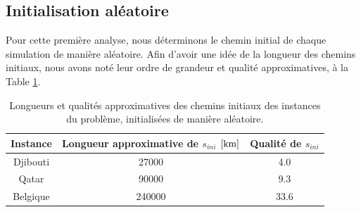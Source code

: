 \documentclass[a4paper, 12pt]{report}
\begin{document}
    \subsection{Initialisation aléatoire}
    Pour cette première analyse, nous déterminons le chemin initial de chaque simulation de manière aléatoire. Afin d'avoir une idée de la longueur des chemins initiaux, nous avons noté leur ordre de grandeur et qualité approximatives, à la Table \ref{tab:random_initialization}.
    \begin{table}[H]
    	\centering
    	\begin{tabular}{|c|c|c|}
    		\hline
    		Instance & Longueur approximative de $s_{ini}$ $\left[\si{\kilo\meter}\right]$ & Qualité de $s_{ini}$ \\ \hline
    		\hline
    		Djibouti & \num{27000} & \num{4.0}\\ \hline
    		Qatar & \num{90000} & \num{9.3}\\ \hline
    		Belgique & \num{240000} & \num{33.6}\\ \hline
    	\end{tabular}
    	\caption{Longueurs et qualités approximatives des chemins initiaux des instances du problème, initialisées de manière aléatoire.}
    	\label{tab:random_initialization}
    \end{table}
\end{document}
